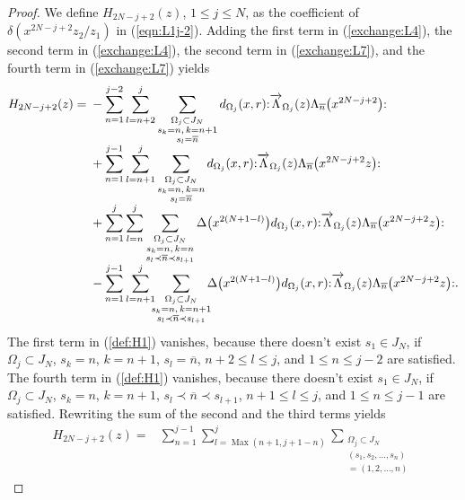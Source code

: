 \documentclass[10pt,a4paper]{amsart}
\numberwithin{equation}{section}
\begin{document}
\begin{proof}
We define $H_{2N-j+2}(z)$, $1\leq j \leq N$, as the coefficient of
$\delta(x^{2N-j+2}z_2/z_1)$ in (\ref{eqn:L1j-2}). Adding the first term in (\ref{exchange:L4}),
the second term in (\ref{exchange:L4}), the second term in (\ref{exchange:L7}),
and the fourth term in (\ref{exchange:L7}) yields
\begin{align}
H_{2N-j+2}(z)={}&-\sum_{n=1}^{j-2}\sum_{l=n+2}^{j}
\sum_{\substack{\Omega_j \subset J_N\\s_k=n,\, k=n+1\\s_l=\overline{n}}}
d_{\Omega_j}(x,r){:}\overrightarrow{\Lambda}_{\Omega_j}(z)
\Lambda_{\overline{n}}\big(x^{2N-j+2}\big){:}\notag
\\[-1ex]
&+\sum_{n=1}^{j-1}\sum_{l=n+1}^{j}\sum_{\substack{\Omega_j \subset J_N\\
s_k=n,\, k=n\\s_l=\overline{n}}}d_{\Omega_j}(x,r)
{:}\overrightarrow{\Lambda}_{\Omega_j}(z)
\Lambda_{\overline{n}}\big(x^{2N-j+2}z\big){:}\notag
\\[-1ex]
&+\sum_{n=1}^{j}\sum_{l=n}^{j}\sum_{\substack{\Omega_j \subset J_N
\\s_k=n,\, k=n\\ s_l \prec \overline{n} \prec s_{l+1}}}
\Delta\big(x^{2(N+1-l)}\big) d_{\Omega_j}(x,r)
{:}\overrightarrow{\Lambda}_{\Omega_j}(z)
\Lambda_{\overline{n}}\big(x^{2N-j+2}z\big){:}\notag
\\[-1ex]
&-\sum_{n=1}^{j-1}\sum_{l=n+1}^{j}\!\!\!\sum_{\substack{\Omega_j \subset J_N
\\s_k=n,\, k=n+1\\s_l\prec \overline{n} \prec s_{l+1}}}
\!\!\!\Delta\big(x^{2(N+1-l)}\big) d_{\Omega_j}(x,r)
{:}\overrightarrow{\Lambda}_{\Omega_j}(z)
\Lambda_{\overline{n}}\big(x^{2N-j+2}z\big){:}.
\label{def:H1}
\end{align}
The first term in (\ref{def:H1}) vanishes,
because there doesn't exist $s_1 \in J_N$,
if $\Omega_j \subset J_N$, $s_k=n$, $k=n+1$, $s_l=\overline{n}$, $n+2\leq l \leq j$,
and $1\leq n \leq j-2$ are satisfied. The fourth term in (\ref{def:H1}) vanishes,
because there doesn't exist $s_1 \in J_N$,
if $\Omega_j \subset J_N$, $s_k=n$, $k=n+1$,
$s_l \prec \overline{n} \prec s_{l+1}$, $n+1\leq l \leq j$, and $1\leq n \leq j-1$ are satisfied.
Rewriting the sum of the second and the third terms yields
\begin{align*}
{H}_{2N-j+2}(z)={}&\sum_{n=1}^{j-1}\sum_{l=\operatorname{Max}(n+1,j+1-n)}^{j}
\sum_{\substack{\Omega_j \subset J_N\\(s_1, s_2, \dots, s_n)\\=(1, 2, \dots, n)
}}
\end{align*}
\end{proof}
\end{document}
